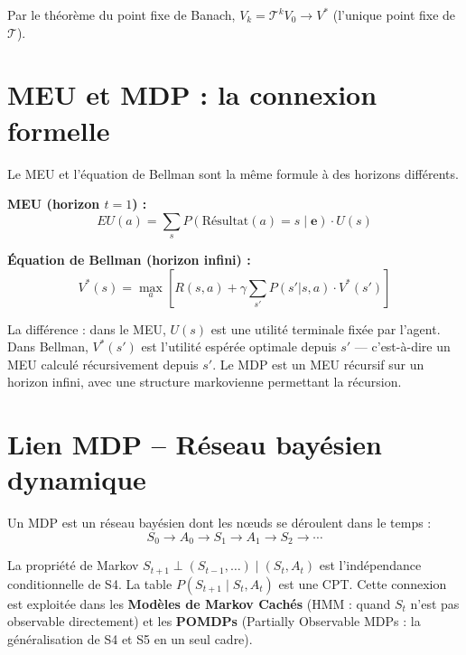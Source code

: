 \documentclass[11pt,a4paper]{article}
\begin{document}
Par le théorème du point fixe de Banach, $V_k = \mathcal{T}^k V_0 \to V^*$ (l'unique point fixe de $\mathcal{T}$).

\section{MEU et MDP : la connexion formelle}

Le MEU et l'équation de Bellman sont la même formule à des horizons différents.

\textbf{MEU (horizon $t=1$) :}
$$EU(a) = \sum_{s} P(\text{Résultat}(a)=s \mid \mathbf{e}) \cdot U(s)$$

\textbf{Équation de Bellman (horizon infini) :}
$$V^*(s) = \max_a \left[ R(s,a) + \gamma \sum_{s'} P(s'|s,a) \cdot V^*(s') \right]$$

La différence : dans le MEU, $U(s)$ est une utilité terminale fixée par l'agent. Dans Bellman, $V^*(s')$ est l'utilité espérée optimale depuis $s'$ --- c'est-à-dire un MEU calculé récursivement depuis $s'$. Le MDP est un MEU récursif sur un horizon infini, avec une structure markovienne permettant la récursion.

\section{Lien MDP -- Réseau bayésien dynamique}

Un MDP est un réseau bayésien dont les nœuds se déroulent dans le temps :
$$S_0 \to A_0 \to S_1 \to A_1 \to S_2 \to \cdots$$

La propriété de Markov $S_{t+1} \perp (S_{t-1},\ldots) \mid (S_t, A_t)$ est l'indépendance conditionnelle de S4. La table $P(S_{t+1} \mid S_t, A_t)$ est une CPT. Cette connexion est exploitée dans les \textbf{Modèles de Markov Cachés} (HMM : quand $S_t$ n'est pas observable directement) et les \textbf{POMDPs} (Partially Observable MDPs : la généralisation de S4 et S5 en un seul cadre).
\end{document}
